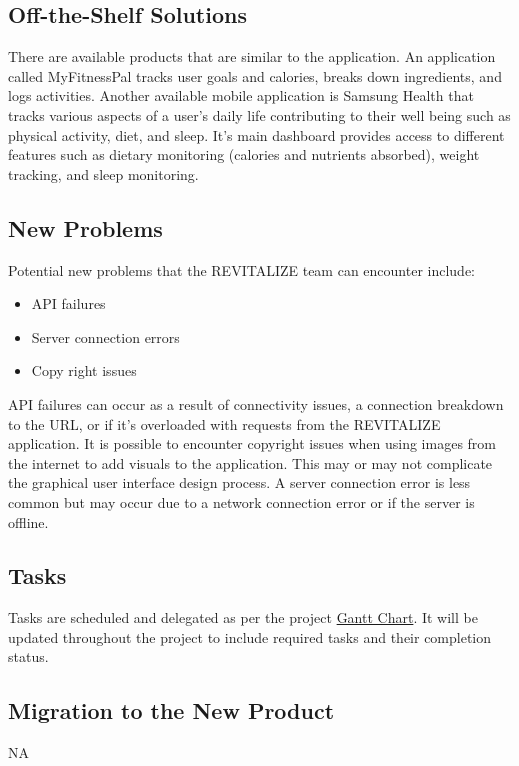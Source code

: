 \documentclass[12pt,letterpaper]{article}
\begin{document}
\subsection{Off-the-Shelf Solutions}
There are available products that are similar to the application. An application called MyFitnessPal tracks user goals and calories, breaks down ingredients, and logs activities. Another available mobile application is Samsung Health that tracks various aspects of a user's daily life contributing to their well being such as physical activity, diet, and sleep. It's main dashboard provides access to different features such as dietary monitoring (calories and nutrients absorbed), weight tracking, and sleep monitoring. 

\subsection{New Problems}
Potential new problems that the REVITALIZE team can encounter include:
\begin{itemize}
	\item API failures
	\item Server connection errors
	\item Copy right issues
\end{itemize}
API failures can occur as a result of connectivity issues, a connection breakdown to the URL, or if it's overloaded with requests from the REVITALIZE application. It is possible to encounter copyright issues when using images from the internet to add visuals to the application. This may or may not complicate the graphical user interface design process. A server connection error is less common but may occur due to a network connection error or if the server is offline.

\subsection{Tasks}
Tasks are scheduled and delegated as per the project \href{https://github.com/BillNguyen1999/REVITALIZE/blob/main/projectschedule/REVITALIZE.pdf}{\color{blue}Gantt Chart}. It will be updated throughout the project to include required tasks and their completion status.

\subsection{Migration to the New Product}
NA
\end{document}
